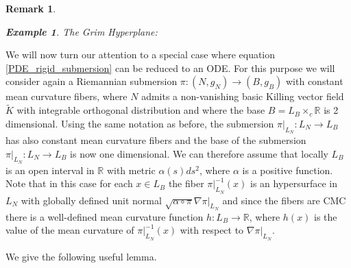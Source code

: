 \documentclass[12pt]{article}
\newtheorem{examp}[lemma]{Example}
\newtheorem{remark}[lemma]{Remark}
\numberwithin{lemma}{section}
\newenvironment{example}[1]{\begin{examp} #1: %
\normalfont }{\end{examp}}
\begin{document}
{\begin{remark}
\begin{example}{The Grim Hyperplane}
\end{example}
\end{remark}
We will now turn our attention to a special case where equation \eqref{PDE_rigid_submersion} can be reduced to an ODE. For this purpose we will consider again a Riemannian submersion $\pi:(N,g_N)\rightarrow (B,g_B)$ with constant mean curvature fibers, where $N$ admits a non-vanishing basic Killing vector field $\widetilde{K}$  with integrable orthogonal distribution and where the base $B=L_B\times_c\mathbb{R}$ is 2 dimensional. Using the same notation as before, the submersion $\pi|_{L_N}: L_N\rightarrow L_B$ has also constant mean curvature fibers and the base of the submersion $\pi|_{L_N}: L_N\rightarrow L_B$ is now one dimensional. We can therefore assume that locally $L_B$ is an open interval in $\mathbb{R}$ with metric $\alpha(s)ds^2$, where $\alpha$ is a positive function. Note that in this case for each $x\in L_B$ the fiber $\pi|_{L_N}^{-1}(x)$ is an hypersurface in $L_N$ with globally defined unit normal $\sqrt{\alpha\circ\pi}\nabla \pi|_{L_N}$ and since the fibers are CMC there is a well-defined mean curvature function $h: L_B\rightarrow\mathbb{R}$, where $h(x)$ is the value of the mean curvature of $\pi|_{L_N}^{-1}(x)$ with respect to $\nabla \pi|_{L_N}$.    %

We give the following useful lemma. 



}
\end{document}

